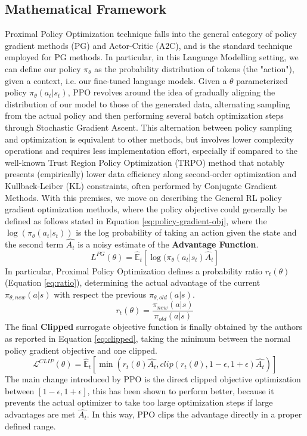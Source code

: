 \documentclass{article}
\begin{document}
\subsection{Mathematical Framework}
Proximal Policy Optimization technique falls into the general category of policy gradient methods (PG) and Actor-Critic (A2C), and is the standard technique employed for PG methods. In particular, in this Language Modelling setting, we can define our policy $\pi_\theta$ as the probability distribution of tokens (the "action"), given a context, i.e. our fine-tuned language models. 
Given a $\theta$ parameterized policy $\pi_\theta(a_t \vert s_t)$, PPO revolves around the idea of gradually aligning the distribution of our model to those of the generated data, alternating sampling from the actual policy and then performing several batch optimization steps through Stochastic Gradient Ascent. This alternation between policy sampling and optimization is equivalent to other methods, but involves lower complexity operations and requires less implementation effort, especially if compared to the well-known Trust Region Policy Optimization (TRPO)\cite{trpo} method that notably presents (empirically) lower data efficiency along second-order optimization and Kullback-Leiber (KL) constraints, often performed by Conjugate Gradient Methods.
With this premises, we move on describing  the General RL policy gradient optimization methods, where the policy objective could generally be defined as follows stated in Equation \ref{eq:policy-gradient-obj}, where the $\log(\pi_{\theta}(a_t|s_t))$ is the log probability of taking an action given the state and the second term $\hat{A_t}$ is a noisy estimate of the \textbf{Advantage Function}.
\begin{equation}
    L^{PG}(\theta) = \hat{\mathbb{E}}_t[\log(\pi_{\theta}(a_t|s_t)\hat{A}_t] 
    \label{eq:policy-gradient-obj}
\end{equation}
In particular, Proximal Policy Optimization defines a probability ratio $r_t(\theta)$ (Equation \ref{eq:ratio}), determining the actual advantage of the current $\pi_{\theta,new}(a \vert s)$ with respect the previous $\pi_{\theta,old}(a \vert s)$.
\begin{equation}
    r_t(\theta) = \frac{\pi_{new}(a|s)}{\pi_{old}(a|s)}
    \label{eq:ratio}
\end{equation}
\noindent
The final \textbf{Clipped} surrogate objective function is finally obtained by the authors as reported in Equation \ref{eq:clipped}, taking the minimum between the normal policy gradient objective and one clipped.
\begin{equation}
    \mathcal{L}^{CLIP}(\theta) = \mathbb{\hat{E}}_t[\min(r_t(\theta)\hat{A_t},clip(r_t(\theta), 1-\epsilon, 1+\epsilon)\hat{A_t})]
    \label{eq:clipped}
\end{equation}
\noindent
The main change introduced by PPO is the direct clipped objective optimization between $[1-\epsilon, 1+\epsilon]$, this has been shown to perform better, because it prevents the actual optimizer to take too large optimization steps if large advantages are met $\hat{A_t}$. In this way,  PPO clips the advantage directly in a proper defined range. 
\end{document}
